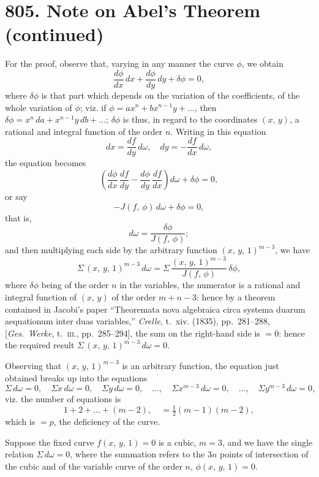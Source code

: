 \documentclass[11pt,a4paper]{article}
\theoremstyle{plain}
\theoremstyle{definition}
\theoremstyle{remark}
\begin{document}
\section*{805. Note on Abel's Theorem (continued)}

For the proof, observe that, varying in any manner the curve $\phi$, we obtain
\[
\frac{d\phi}{dx}\,dx + \frac{d\phi}{dy}\,dy + \delta\phi = 0,
\]
where $\delta\phi$ is that part which depends on the variation of the coefficients, of the whole variation of $\phi$; viz. if $\phi = ax^n + bx^{n-1}y + \ldots$, then $\delta\phi = x^n\,da + x^{n-1}y\,db + \ldots$; $\delta\phi$ is thus, in regard to the coordinates $(x,\,y)$, a rational and integral function of the order $n$. Writing in this equation
\[
dx = \frac{df}{dy}\,d\omega,\quad dy = -\frac{df}{dx}\,d\omega,
\]
the equation becomes
\[
\left(\frac{d\phi}{dx}\,\frac{df}{dy} - \frac{d\phi}{dy}\,\frac{df}{dx}\right) d\omega + \delta\phi = 0,
\]
or say
\[
-J(f,\,\phi)\,d\omega + \delta\phi = 0,
\]
that is,
\[
d\omega = \frac{\delta\phi}{J(f,\,\phi)};
\]
and then multiplying each side by the arbitrary function $(x,\,y,\,1)^{m-3}$, we have
\[
\Sigma\,(x,\,y,\,1)^{m-3}\,d\omega = \Sigma\,\frac{(x,\,y,\,1)^{m-3}}{J(f,\,\phi)}\,\delta\phi,
\]
where $\delta\phi$ being of the order $n$ in the variables, the numerator is a rational and integral function of $(x,\,y)$ of the order $m+n-3$: hence by a theorem contained in Jacobi's paper ``Theoremata nova algebraica circa systema duarum aequationum inter duas variables,'' \textit{Crelle}, t.~xiv. (1835), pp.~281--288, [\textit{Ges.\ Werke}, t.~\textsc{iii.}, pp.~285--294], the sum on the right-hand side is $=0$: hence the required result $\Sigma\,(x,\,y,\,1)^{m-3}\,d\omega = 0$.

Observing that $(x,\,y,\,1)^{m-3}$ is an arbitrary function, the equation just obtained breaks up into the equations
\[
\Sigma\,d\omega = 0,\quad \Sigma x\,d\omega = 0,\quad \Sigma y\,d\omega = 0,\quad \ldots,\quad \Sigma x^{m-3}\,d\omega = 0,\quad \ldots,\quad \Sigma y^{m-3}\,d\omega = 0,
\]
viz. the number of equations is
\[
1 + 2 + \ldots + (m-2),\quad = \tfrac{1}{2}(m-1)(m-2),
\]
which is $=p$, the deficiency of the curve.

Suppose the fixed curve $f(x,\,y,\,1)=0$ is a cubic, $m=3$, and we have the single relation $\Sigma\,d\omega = 0$, where the summation refers to the $3n$ points of intersection of the cubic and of the variable curve of the order $n$, $\phi(x,\,y,\,1)=0$.
\end{document}

